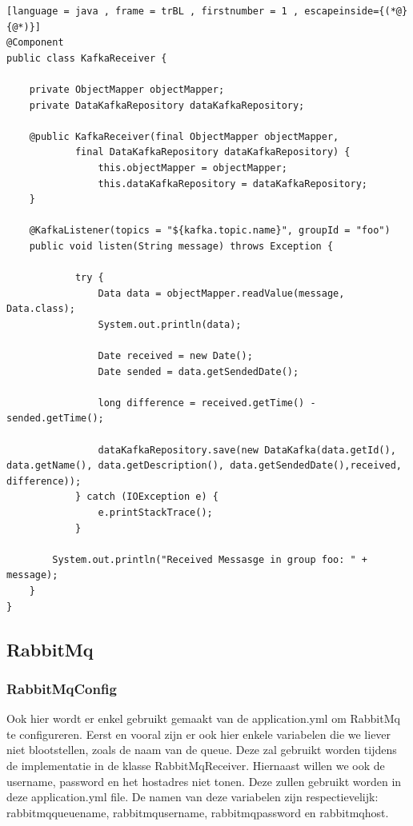 \begin{lstlisting}[language = java , frame = trBL , firstnumber = 1 , escapeinside={(*@}{@*)}]
@Component
public class KafkaReceiver {

    private ObjectMapper objectMapper;
    private DataKafkaRepository dataKafkaRepository;

    @public KafkaReceiver(final ObjectMapper objectMapper,
            final DataKafkaRepository dataKafkaRepository) {
                this.objectMapper = objectMapper;
                this.dataKafkaRepository = dataKafkaRepository;
    }

    @KafkaListener(topics = "${kafka.topic.name}", groupId = "foo")
    public void listen(String message) throws Exception {

            try {
                Data data = objectMapper.readValue(message, Data.class);
                System.out.println(data);

                Date received = new Date();
                Date sended = data.getSendedDate();

                long difference = received.getTime() - sended.getTime();

                dataKafkaRepository.save(new DataKafka(data.getId(), data.getName(), data.getDescription(), data.getSendedDate(),received, difference));
            } catch (IOException e) {
                e.printStackTrace();
            }

        System.out.println("Received Messasge in group foo: " + message);
    }
}
\end{lstlisting}
\subsection{RabbitMq}
\subsubsection{RabbitMqConfig}
Ook hier wordt er enkel gebruikt gemaakt van de application.yml om RabbitMq te configureren. Eerst en vooral zijn er ook hier enkele variabelen die we liever niet blootstellen, zoals de naam van de queue. Deze zal gebruikt worden tijdens de implementatie in de klasse RabbitMqReceiver. Hiernaast willen we ook de username,  password en het hostadres niet tonen. Deze zullen gebruikt worden in deze application.yml file. De namen van deze variabelen zijn respectievelijk: rabbitmq\textunderscore queue\textunderscore name, rabbitmq\textunderscore username, rabbitmq\textunderscore password en rabbitmq\textunderscore host. 

